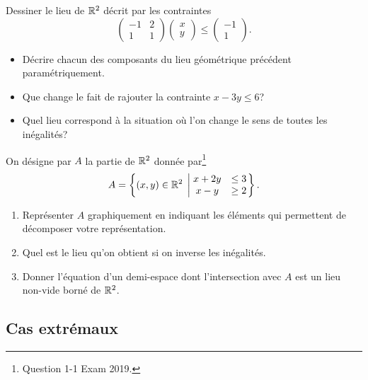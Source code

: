 \documentclass[11pt, a4paper]{article}
\begin{document}
\begin{question}
  Dessiner le lieu de $\mathbb{R}^2$ décrit par les contraintes
  \[
    \begin{pmatrix}
      -1 & 2 \\
      1 & 1
    \end{pmatrix}
    \begin{pmatrix}
      x \\ y
    \end{pmatrix}
    \leq
    \begin{pmatrix}
      -1 \\ 1
    \end{pmatrix}.
  \]
  \begin{itemize}
  \item Décrire chacun des composants du lieu géométrique précédent
    paramétriquement.
  \item Que change le fait de rajouter la contrainte $x - 3 y \leq 6$?
  \item Quel lieu correspond à la situation où l'on change le sens de
    toutes les inégalités?
  \end{itemize}
\end{question}
\begin{question}
  On désigne par $A$ la partie de $\mathbb{R}^2$ donnée par\footnote{Question
    1-1 Exam 2019.}
  \[
    A = \left\{ (x, y) \in \mathbb{R}^2 \; \left| \; \begin{matrix} x + 2y & \leq 3 \\ x - y &
          \geq 2 \end{matrix}\right.\right\}.
  \]
  \begin{enumerate}
  \item
    Représenter $A$ graphiquement en indiquant les éléments qui
    permettent de décomposer votre représentation.
  \item
    Quel est le lieu qu'on obtient si on inverse les inégalités.
  \item
    Donner l'équation d'un demi-espace dont l'intersection avec $A$
    est un lieu non-vide borné de $\mathbb{R}^2$.
  \end{enumerate}
\end{question}

\subsection{Cas extrémaux}
\end{document}
